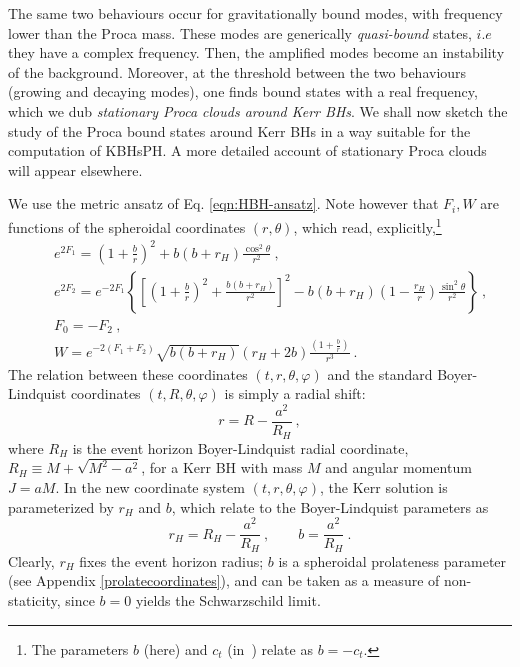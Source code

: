 The same two behaviours occur for gravitationally bound modes, with frequency lower than the Proca mass. These modes are generically \textit{quasi-bound} states, $i.e$ they have a complex frequency. Then, the amplified modes become an instability of the background. Moreover, at the threshold between the two behaviours (growing and decaying modes), one finds bound states with a real frequency, which we dub \textit{stationary Proca clouds around Kerr BHs}. We shall now sketch the study of the Proca bound states around Kerr BHs in a way suitable for the computation of KBHsPH. A more detailed account of stationary Proca clouds will appear elsewhere. 

We use the metric ansatz of Eq. \eqref{eqn:HBH-ansatz}.
Note however that $F_i,W$ are functions of the spheroidal coordinates $(r,\theta)$, which read, explicitly,\footnote{The parameters $b$ (here) and $c_t$ (in~\cite{Herdeiro:2015gia}) relate as $b=-c_t$.}
%
\begin{eqnarray}
\nonumber
&&
e^{2F_1}=\left(1+\frac{b}{r}\right)^2+b(b+r_H)\frac{\cos^2\theta}{r^2}\ ,
\\
\nonumber
&&
e^{2F_2}=e^{-2F_1}
\left\{
          \left[
\left(1+\frac{b}{r}\right)^2+\frac{b(b+r_H)}{r^2}
          \right]^2-b(b+r_H)\left(1-\frac{r_H}{r}\right)\frac{\sin^2\theta}{r^2}
\right\}\ ,
\\
\nonumber
&&
F_0=-F_2 \ , \\
&&
\label{functionsKerr}
\displaystyle{W=e^{-2(F_1+F_2)}
\sqrt{b(b+r_H)}(r_H+2b)
\frac{(1+\frac{b}{r})}{r^3}} \ .
\end{eqnarray}
The relation between these coordinates $(t,r,\theta,\varphi)$ and the standard Boyer-Lindquist coordinates $(t,R,\theta,\varphi)$ is simply a radial shift:
\begin{equation}
r=R-\frac{a^2}{R_H} \ , 
\end{equation}
where $R_H$ is the event horizon Boyer-Lindquist radial coordinate,  $R_H\equiv M+\sqrt{M^2-a^2}$, for a Kerr BH with mass $M$ and angular momentum $J=aM$. In the new coordinate system $(t,r,\theta,\varphi)$, the Kerr solution is parameterized by $r_H$ and $b$, which relate to the Boyer-Lindquist parameters as
\begin{equation}
r_H=R_H-\frac{a^2}{R_H} \ , \qquad b=\frac{a^2}{R_H} \ .
\end{equation}
Clearly, $r_H$ fixes the event horizon radius; $b$ is a spheroidal prolateness parameter (see Appendix \ref{prolatecoordinates}), and can be taken as a measure of non-staticity, since $b=0$ yields the Schwarzschild limit.

